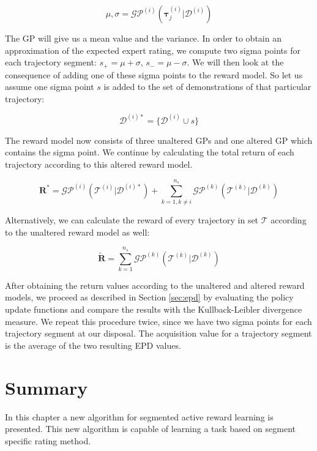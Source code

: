 \documentclass[mscThesis.tex]{subfiles}
\begin{document}
\begin{equation*}
    \mu, \sigma = \mathcal{GP}^{(i)} (\bm{\tau}^{(i)}_j | \mathcal{D}^{(i)})
\end{equation*}

The GP will give us a mean value and the variance. In order to obtain an approximation of the expected expert rating, we compute two sigma points for each trajectory segment: $s_+=\mu+\sigma$, $s_-=\mu-\sigma$. We will then look at the consequence of adding one of these sigma points to the reward model. So let us assume one sigma point $s$ is added to the set of demonstrations of that particular trajectory: 

\begin{equation*}
    \mathcal{D}^{(i)*}=\{ \mathcal{D}^{(i)} \cup s \}
\end{equation*}

The reward model now consists of three unaltered GPs and one altered GP which contains the sigma point. We continue by calculating the total return of each trajectory according to this altered reward model. 

\begin{equation*}
    \bm{R}^{*} = \mathcal{GP}^{(i)} (\mathcal{T}^{(i)} | \mathcal{D}^{(i)*}) +  \sum_{k=1, k\neq i}^{n_s} \mathcal{GP}^{(k)} (\mathcal{T}^{(k)} | \mathcal{D}^{(k)}) 
\end{equation*}

Alternatively, we can calculate the reward of every trajectory in set $\mathcal{T}$ according to the unaltered reward model as well:

\begin{equation*}
    \tilde{\bm{R}} =  \sum_{k=1}^{n_s} \mathcal{GP}^{(k)} (\mathcal{T}^{(k)} | \mathcal{D}^{(k)}) 
\end{equation*}

After obtaining the return values according to the unaltered and altered reward models, we proceed as described in Section \ref{sec:epd} by evaluating the policy update functions and compare the results with the Kullback-Leibler divergence measure. We repeat this procedure twice, since we have two sigma points for each trajectory segment at our disposal. The acquisition value for a trajectory segment is the average of the two resulting EPD values. 

\section{Summary}
In this chapter a new algorithm for segmented active reward learning is presented. This new algorithm is capable of learning a task based on segment specific rating method. 
\end{document}
